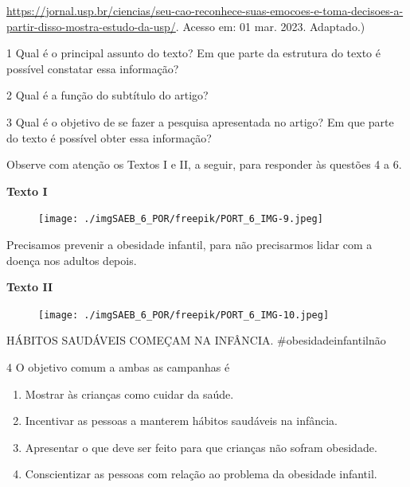 \url{https://jornal.usp.br/ciencias/seu-cao-reconhece-suas-emocoes-e-toma-decisoes-a-partir-disso-mostra-estudo-da-usp/}.
Acesso em: 01 mar. 2023. Adaptado.)

\num{1} Qual é o principal assunto do texto? Em que parte da estrutura
do texto é possível constatar essa informação?


\num{2} Qual é a função do subtítulo do artigo?


\num{3} Qual é o objetivo de se fazer a pesquisa apresentada no artigo?
Em que parte do texto é possível obter essa informação?


Observe com atenção os Textos I e II, a seguir, para responder às
questões 4 a 6.

\textbf{Texto I}

\begin{figure}
\texttt{[image: ./imgSAEB\_6\_POR/freepik/PORT\_6\_IMG-9.jpeg]}
\end{figure}

Precisamos prevenir a obesidade infantil, para não precisarmos lidar com
a doença nos adultos depois.

\textbf{Texto II}

\begin{figure}
\texttt{[image: ./imgSAEB\_6\_POR/freepik/PORT\_6\_IMG-10.jpeg]}
\end{figure}

HÁBITOS SAUDÁVEIS COMEÇAM NA INFÂNCIA. \#obesidadeinfantilnão

\num{4} O objetivo comum a ambas as campanhas é

\begin{enumerate}
\def\labelenumi{\alph{enumi})}
\item Mostrar às crianças como cuidar da saúde.
\item Incentivar as pessoas a manterem hábitos saudáveis na infância.
\item Apresentar o que deve ser feito para que crianças não sofram
obesidade.
\item Conscientizar as pessoas com relação ao problema da obesidade
infantil.
\end{enumerate}


